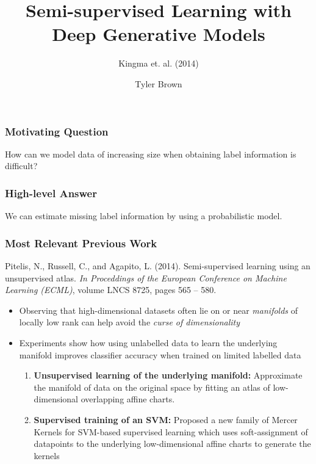 \documentclass{beamer}
\title{Semi-supervised Learning with Deep Generative Models}
\subtitle{Kingma et. al. (2014)}
\author{Tyler Brown}
\institute{CS 7180}
\date{}
\begin{document}
 
\frame{\titlepage}
 
\begin{frame}
  \frametitle{Motivating Question}
  How can we model data of increasing size when obtaining label 
  information is difficult?
\end{frame}

\begin{frame}
  \frametitle{High-level Answer}

  We can estimate missing label information by
  using a probabilistic model.
  
\end{frame}

\begin{frame}
  \frametitle{Most Relevant Previous Work}

  Pitelis, N., Russell, C., and Agapito, L. (2014). Semi-supervised
  learning using an unsupervised atlas. \textit{In Proceddings of the
    European Conference on Machine Learning (ECML)}, volume LNCS 8725,
  pages 565 – 580.

  \begin{itemize}
  \item Observing that high-dimensional datasets often lie on or near
    \textit{manifolds} of locally low rank can help avoid the
    \textit{curse of dimensionality}
  \item Experiments show how using unlabelled data to learn the underlying
    manifold improves classifier accuracy when trained on limited labelled
    data
    \begin{enumerate}
    \item \textbf{Unsupervised learning of the underlying manifold:}
      Approximate the manifold of data on the original space by fitting
      an atlas of low-dimensional overlapping affine charts.
    \item \textbf{Supervised training of an SVM:} Proposed a new family of
      Mercer Kernels for SVM-based supervised learning which uses
      soft-assignment of datapoints to the underlying low-dimensional affine
      charts to generate the kernels
      \end{enumerate}
    \end{itemize}

  \end{frame}
\end{document}
